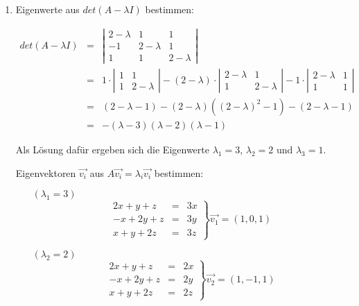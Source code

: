 \documentclass{homework}
\date{Montag, dem 19. November 2012}
\author{Stefan Meißner (4279113) und Niels Hoppe (4356370)}
\begin{document}
\maketitle
\begin{enumerate} 

\begin{enumerate}
\item
Eigenwerte aus $det(A - \lambda I)$ bestimmen:

\begin{eqnarray*}
det(A - \lambda I) & = & \left|\begin{array}{ccc}
2 - \lambda & 1 & 1\\
-1 & 2 - \lambda & 1\\
1 & 1 & 2 - \lambda
\end{array}\right|\\
& = & 1 \cdot \left|\begin{array}{cc}
1 & 1\\ 1 & 2 - \lambda
\end{array}\right| - (2 - \lambda) \cdot \left|\begin{array}{cc}
2 - \lambda & 1\\ 1 & 2 - \lambda
\end{array}\right| - 1 \cdot \left|\begin{array}{cc}
2 - \lambda & 1\\ 1 & 1
\end{array}\right|\\
& = & (2 - \lambda - 1) - (2 - \lambda) ((2 - \lambda)^2 - 1) - (2 - \lambda - 1)\\
& = & -(\lambda - 3)(\lambda-2)(\lambda-1)
\end{eqnarray*}

Als Lösung dafür ergeben sich die Eigenwerte $\lambda_1 = 3$, $\lambda_2 = 2$ und $\lambda_3 = 1$.

Eigenvektoren $\vec{v_i}$ aus $A \vec{v_i} = \lambda_i \vec{v_i}$ bestimmen:

\begin{itemize}
\item[$(\lambda_1 = 3)$]
$$
\left.\begin{array}{rcl}
2x + y + z & = & 3x\\
-x + 2y + z & = & 3y\\
x + y + 2z & = & 3z
\end{array}\right\}
\vec{v_1} = (1, 0, 1)
$$

\item[$(\lambda_2 = 2)$]
$$
\left.\begin{array}{rcl}
2x + y + z & = & 2x\\
-x + 2y + z & = & 2y\\
x + y + 2z & = & 2z
\end{array}\right\}
\vec{v_2} = (1, -1, 1)
$$


\end{itemize}
\end{enumerate}
\end{enumerate}
\end{document}
